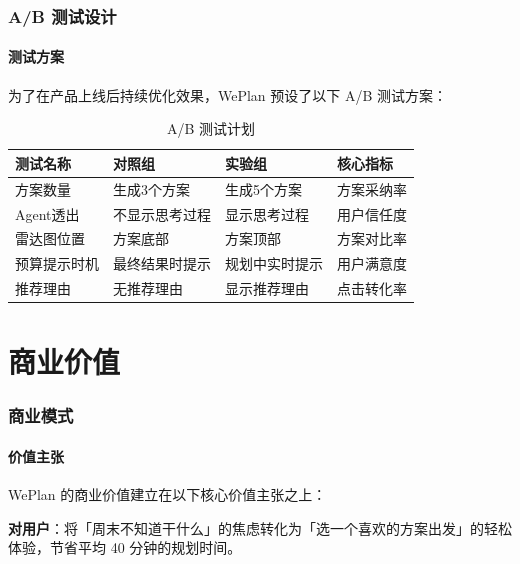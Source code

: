 \documentclass[12pt,a4paper]{ctexart}
\begin{document}
\section{A/B 测试设计}

\subsection{测试方案}

为了在产品上线后持续优化效果，WePlan 预设了以下 A/B 测试方案：

\begin{table}[H]
\centering
\caption{A/B 测试计划}
\label{tab:ab-tests}
\renewcommand{\arraystretch}{1.3}
{\small
\begin{tabular}{p{3cm} p{3cm} p{3cm} p{3cm}}
\toprule
\textbf{测试名称} & \textbf{对照组} & \textbf{实验组} & \textbf{核心指标} \\
\midrule
方案数量 & 生成3个方案 & 生成5个方案 & 方案采纳率 \\
Agent透出 & 不显示思考过程 & 显示思考过程 & 用户信任度 \\
雷达图位置 & 方案底部 & 方案顶部 & 方案对比率 \\
预算提示时机 & 最终结果时提示 & 规划中实时提示 & 用户满意度 \\
推荐理由 & 无推荐理由 & 显示推荐理由 & 点击转化率 \\
\bottomrule
\end{tabular}
}
\end{table}

\newpage


\part{商业价值}

\section{商业模式}

\subsection{价值主张}

WePlan 的商业价值建立在以下核心价值主张之上：

\textbf{对用户}：将「周末不知道干什么」的焦虑转化为「选一个喜欢的方案出发」的轻松体验，节省平均 40 分钟的规划时间。
\end{document}
